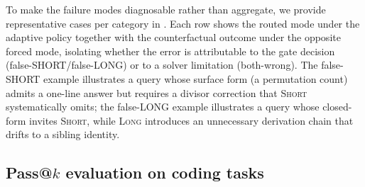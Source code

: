 To make the failure modes diagnosable rather than aggregate, we provide representative cases per category in . Each row shows the routed mode under the adaptive policy together with the counterfactual outcome under the opposite forced mode, isolating whether the error is attributable to the gate decision (false-SHORT/false-LONG) or to a solver limitation (both-wrong). 
The false-SHORT example illustrates a query whose surface form (a permutation count) admits a one-line answer but requires a divisor correction that \textsc{Short} systematically omits; the false-LONG example illustrates a query whose closed-form invites \textsc{Short}, while \textsc{Long} introduces an unnecessary derivation chain that drifts to a sibling identity.

\textcolor{blue}{
\begin{table}[t]
\centering
\small
\caption{Representative misrouting cases on MATH500 (R1-Distill-1.5B, $\tau{=}0.70$). \textit{Adaptive} reports the mode chosen by the learned router and its correctness; \textit{Counterfactual} reports the opposite forced mode's outcome on the same query.}
\label{tab:misrouting_examples}
\end{table}
}

\subsection{Pass@$k$ evaluation on coding tasks}
\label{sec:pass_at_k}

